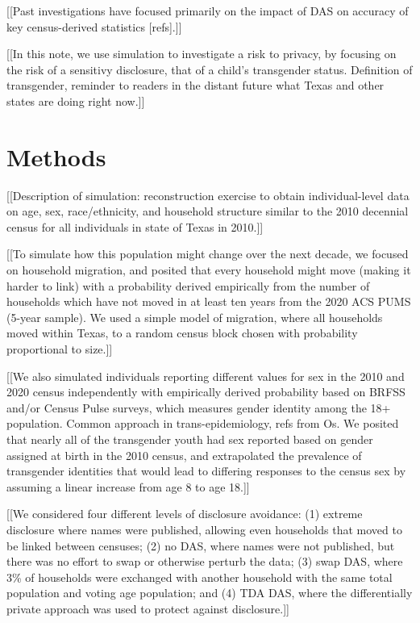 \documentclass{jpc} %
\theoremstyle{plain}\newtheorem{satz}[thm]{Satz} %
\begin{document}
[[Past investigations have focused primarily on the impact of DAS on accuracy of key census-derived statistics [refs].]]

[[In this note, we use simulation to investigate a risk to privacy, by focusing on the risk of a sensitivy disclosure, that of a child's transgender status. Definition of transgender, reminder to readers in the distant future what Texas and other states are doing right now.]]


\section*{Methods}

[[Description of simulation: reconstruction exercise to obtain individual-level data on age, sex, race/ethnicity, and household structure similar to the 2010 decennial census for all individuals in state of Texas in 2010.]]

[[To simulate how this population might change over the next decade, we focused on household migration, and posited that every household might move (making it harder to link) with a probability derived empirically from the number of households which have not moved in at least ten years from the 2020 ACS PUMS (5-year sample). We used a simple model of migration, where all households moved within Texas, to a random census block chosen with probability proportional to size.]]

[[We also simulated individuals reporting different values for sex in the 2010 and 2020 census independently with empirically derived probability based on BRFSS and/or Census Pulse surveys, which measures gender identity among the 18+ population. Common approach in trans-epidemiology, refs from Os.  We posited that nearly all of the transgender youth had sex reported based on gender assigned at birth in the 2010 census, and extrapolated the prevalence of transgender identities that would lead to differing responses to the census sex by assuming a linear increase from age 8 to age 18.]]

[[We considered four different levels of disclosure avoidance: (1) extreme disclosure where names were published, allowing even households that moved to be linked between censuses; (2) no DAS, where names were not published, but there was no effort to swap or otherwise perturb the data; (3) swap DAS, where 3\% of households were exchanged with another household with the same total population and voting age population; and (4) TDA DAS, where the differentially private approach was used to protect against disclosure.]]
\end{document}
